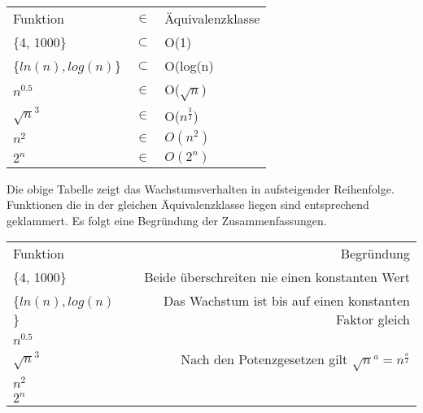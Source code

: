 \begin{tabular}{lcl}
Funktion				& $\in $ 		& Äquivalenzklasse 		\\
\{4, 1000\}				& $\subset$ 	& O(1) 					\\
\{$ln(n), log(n)$\} 	& $\subset$		& O(log(n)				\\
$n^{0.5}$				& $\in$			& O($\sqrt{n}$)			\\
$\sqrt{n}^{3}$			& $\in$			& O($n^{\frac{3}{2}}$)	\\
$n^{2}$					& $\in$			& $O(n^2)$				\\ 
$2^{n}$					& $\in$			& $O(2^n)$				\\ 
\end{tabular}

Die obige Tabelle zeigt das Wachstumsverhalten in aufsteigender Reihenfolge.
Funktionen die in der gleichen Äquivalenzklasse liegen sind entsprechend geklammert.
Es folgt eine Begründung der Zusammenfassungen.

\begin{tabular}{l|r}
Funktion				& Begründung \\
\{4, 1000\}				& Beide überschreiten nie einen konstanten Wert \\
\{$ln(n), log(n)$\} 	& Das Wachstum ist bis auf einen konstanten Faktor gleich \\
$n^{0.5}$				&	\\
$\sqrt{n}^{3}$			& Nach den Potenzgesetzen gilt $\sqrt{n}^a = n ^{\frac{a}{2}} $\\
$n^{2}$					& \\ 
$2^{n}$					& \\ 
\end{tabular}

